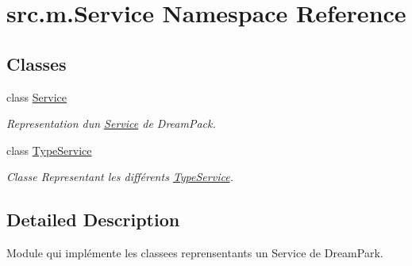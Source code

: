 \hypertarget{namespacesrc_1_1m_1_1_service}{}\section{src.\+m.\+Service Namespace Reference}
\label{namespacesrc_1_1m_1_1_service}
\subsection*{Classes}
\begin{DoxyCompactItemize}
\item 
class \hyperlink{classsrc_1_1m_1_1_service_1_1_service}{Service}
\begin{DoxyCompactList}\small\item\em Representation d\textquotesingle{}un \hyperlink{classsrc_1_1m_1_1_service_1_1_service}{Service} de Dream\+Pack. \end{DoxyCompactList}\item 
class \hyperlink{classsrc_1_1m_1_1_service_1_1_type_service}{Type\+Service}
\begin{DoxyCompactList}\small\item\em Classe Representant les différents \hyperlink{classsrc_1_1m_1_1_service_1_1_type_service}{Type\+Service}. \end{DoxyCompactList}\end{DoxyCompactItemize}


\subsection{Detailed Description}
\begin{DoxyVerb}    Module qui implémente les classees reprensentants un Service de DreamPark.
\end{DoxyVerb}
 